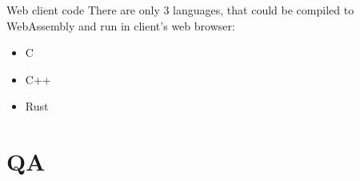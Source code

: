 \documentclass{beamer}
\begin{document}
	\begin{frame}[fragile]{Web client code}
		There are only 3 languages, that could be compiled to WebAssembly
		and run in client's web browser:
		\begin{itemize}
			\item C
			\item C++
			\item Rust
		\end{itemize}
    \end{frame}

\section{QA}
\end{document}
